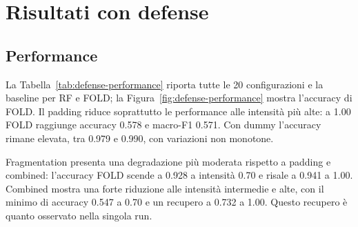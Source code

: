 \documentclass[11pt,a4paper]{article}
\begin{document}
\section{Risultati con defense}
\subsection{Performance}
La Tabella~\ref{tab:defense-performance} riporta tutte le 20 configurazioni e la baseline per RF e FOLD; la Figura~\ref{fig:defense-performance} mostra l'accuracy di FOLD. Il padding riduce soprattutto le performance alle intensità più alte: a 1.00 FOLD raggiunge accuracy 0.578 e macro-F1 0.571. Con dummy l'accuracy rimane elevata, tra 0.979 e 0.990, con variazioni non monotone.

Fragmentation presenta una degradazione più moderata rispetto a padding e combined: l'accuracy FOLD scende a 0.928 a intensità 0.70 e risale a 0.941 a 1.00. Combined mostra una forte riduzione alle intensità intermedie e alte, con il minimo di accuracy 0.547 a 0.70 e un recupero a 0.732 a 1.00. Questo recupero è quanto osservato nella singola run.
\end{document}
